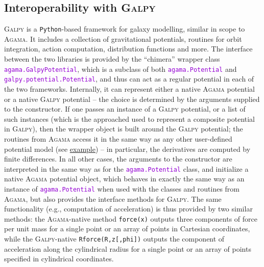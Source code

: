 \documentclass[12pt]{article}
\newcommand{\Agama}{\textsc{Agama}\xspace}
\newcommand{\Galpy}{\textsc{Galpy}\xspace}
\newcommand{\Python}{\texttt{Python}\xspace}
\newcommand{\ttt}[1]{\textcolor{darkviolet}{\texttt{#1}}}
\begin{document}
\subsection{Interoperability with \Galpy}  \label{sec:Galpy}

\Galpy \cite{Bovy2015} is a \Python-based framework for galaxy modelling, similar in scope to \Agama. It includes a collection of gravitational potentials, routines for orbit integration, action computation, distribution functions and more. 
The interface between the two libraries is provided by the ``chimera'' wrapper class \ttt{agama.GalpyPotential}, which is a subclass of both \ttt{agama.Potential} and \ttt{galpy.potential.Potential}, and thus can act as a regular potential in each of the two frameworks. Internally, it can represent either a native \Agama potential or a native \Galpy potential -- the choice is determined by the arguments supplied to the constructor. If one passes an instance of a \Galpy potential, or a list of such instances (which is the approached used to represent a composite potential in \Galpy), then the wrapper object is built around the \Galpy potential; the routines from \Agama access it in the same way as any other user-defined potential model (see \hyperref[sec:PythonPotential]{example}) -- in particular, the derivatives are computed by finite differences. In all other cases, the arguments to the constructor are interpreted in the same way as for the \ttt{agama.Potential} class, and initialize a native \Agama potential object, which behaves in exactly the same way as an instance of \ttt{agama.Potential} when used with the classes and routines from \Agama, but also provides the interface methods for \Galpy. The same functionality (e.g., computation of acceleration) is thus provided by two similar methods: the \Agama-native method \texttt{force(x)} outputs three components of force per unit mass for a single point or an array of points in Cartesian coordinates, while the \Galpy-native \texttt{Rforce(R,z[,phi])} outputs the component of acceleration along the cylindrical radius for a single point or an array of points specified in cylindrical coordinates.
\end{document}
